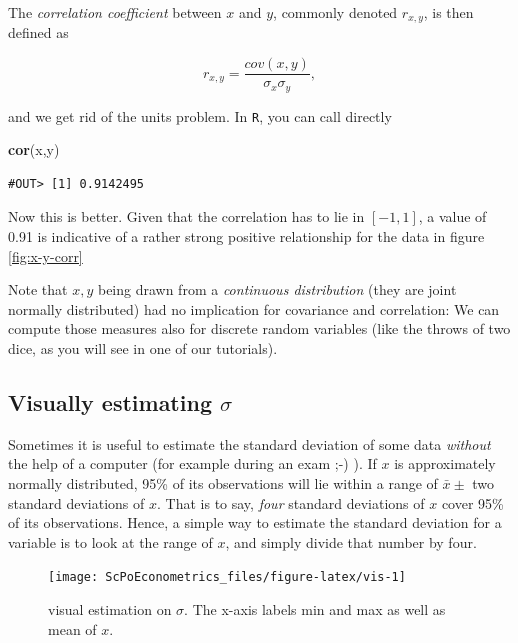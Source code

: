 \documentclass[]{book}
\newenvironment{Shaded}{\begin{snugshade}}{\end{snugshade}}
\newcommand{\KeywordTok}[1]{\textcolor[rgb]{0.13,0.29,0.53}{\textbf{#1}}}
\newcommand{\NormalTok}[1]{#1}
\begin{document}
The \emph{correlation coefficient} between \(x\) and \(y\), commonly denoted \(r_{x,y}\), is then defined as

\[
r_{x,y} = \frac{cov(x,y)}{\sigma_x \sigma_y},
\]

and we get rid of the units problem. In \texttt{R}, you can call directly

\begin{Shaded}
\begin{Highlighting}[]
\KeywordTok{cor}\NormalTok{(x,y)}
\end{Highlighting}
\end{Shaded}

\begin{verbatim}
#OUT> [1] 0.9142495
\end{verbatim}

Now this is better. Given that the correlation has to lie in \([-1,1]\), a value of 0.91 is indicative of a rather strong positive relationship for the data in figure \ref{fig:x-y-corr}

Note that \(x,y\) being drawn from a \emph{continuous distribution} (they are joint normally distributed) had no implication for covariance and correlation: We can compute those measures also for discrete random variables (like the throws of two dice, as you will see in one of our tutorials).

\hypertarget{visually-estimating-sigma}{%
\subsection{\texorpdfstring{Visually estimating \(\sigma\)}{Visually estimating \textbackslash{}sigma}}\label{visually-estimating-sigma}}

Sometimes it is useful to estimate the standard deviation of some data \emph{without} the help of a computer (for example during an exam ;-) ). If \(x\) is approximately normally distributed, 95\% of its observations will lie within a range of \(\bar{x}\pm\) two standard deviations of \(x\). That is to say, \emph{four} standard deviations of \(x\) cover 95\% of its observations. Hence, a simple way to estimate the standard deviation for a variable is to look at the range of \(x\), and simply divide that number by four.

\begin{figure}

{\centering \texttt{[image: ScPoEconometrics\_files/figure-latex/vis-1]} 

}

\caption{visual estimation on $\sigma$. The x-axis labels min and max as well as mean of $x$.}\label{fig:vis}
\end{figure}
\end{document}
